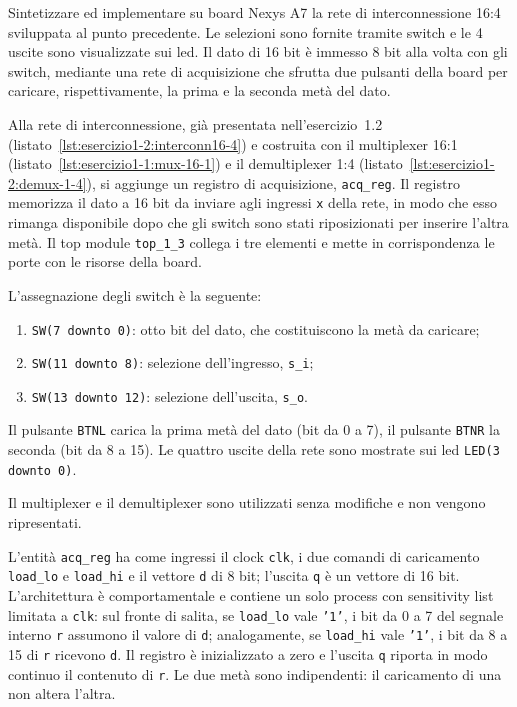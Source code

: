 \label{sec:esercizio1-3}

\begin{traccia}
Sintetizzare ed implementare su board Nexys A7 la rete di interconnessione 16:4 sviluppata al punto precedente. Le selezioni sono fornite tramite switch e le 4 uscite sono visualizzate sui led. Il dato di 16 bit è immesso 8 bit alla volta con gli switch, mediante una rete di acquisizione che sfrutta due pulsanti della board per caricare, rispettivamente, la prima e la seconda metà del dato.
\end{traccia}

\progetto

Alla rete di interconnessione, già presentata nell'esercizio~1.2 (listato~\ref{lst:esercizio1-2:interconn16-4}) e costruita con il multiplexer 16:1 (listato~\ref{lst:esercizio1-1:mux-16-1}) e il demultiplexer 1:4 (listato~\ref{lst:esercizio1-2:demux-1-4}), si aggiunge un registro di acquisizione, \texttt{acq\_reg}. Il registro memorizza il dato a 16 bit da inviare agli ingressi \texttt{x} della rete, in modo che esso rimanga disponibile dopo che gli switch sono stati riposizionati per inserire l'altra metà. Il top module \texttt{top\_1\_3} collega i tre elementi e mette in corrispondenza le porte con le risorse della board.

L'assegnazione degli switch è la seguente:
\begin{enumerate}
  \item \texttt{SW(7 downto 0)}: otto bit del dato, che costituiscono la metà da caricare;
  \item \texttt{SW(11 downto 8)}: selezione dell'ingresso, \texttt{s\_i};
  \item \texttt{SW(13 downto 12)}: selezione dell'uscita, \texttt{s\_o}.
\end{enumerate}
Il pulsante \texttt{BTNL} carica la prima metà del dato (bit da 0 a 7), il pulsante \texttt{BTNR} la seconda (bit da 8 a 15). Le quattro uscite della rete sono mostrate sui led \texttt{LED(3 downto 0)}.

Il multiplexer e il demultiplexer sono utilizzati senza modifiche e non vengono ripresentati.

\implementazione

L'entità \texttt{acq\_reg} ha come ingressi il clock \texttt{clk}, i due comandi di caricamento \texttt{load\_lo} e \texttt{load\_hi} e il vettore \texttt{d} di 8 bit; l'uscita \texttt{q} è un vettore di 16 bit. L'architettura è comportamentale e contiene un solo process con sensitivity list limitata a \texttt{clk}: sul fronte di salita, se \texttt{load\_lo} vale \texttt{'1'}, i bit da 0 a 7 del segnale interno \texttt{r} assumono il valore di \texttt{d}; analogamente, se \texttt{load\_hi} vale \texttt{'1'}, i bit da 8 a 15 di \texttt{r} ricevono \texttt{d}. Il registro è inizializzato a zero e l'uscita \texttt{q} riporta in modo continuo il contenuto di \texttt{r}. Le due metà sono indipendenti: il caricamento di una non altera l'altra.

